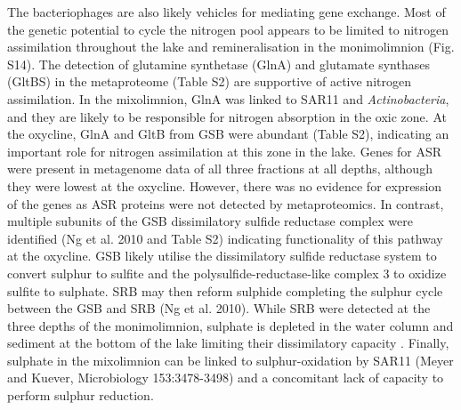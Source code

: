 The bacteriophages are also likely vehicles for mediating gene exchange.
Most of the genetic potential to cycle the nitrogen pool appears to be limited to nitrogen assimilation throughout the lake and remineralisation in the monimolimnion (Fig. S14). 
The detection of glutamine synthetase (GlnA) and glutamate synthases (GltBS) in the metaproteome (Table S2) are supportive of active nitrogen assimilation. 
In the mixolimnion, GlnA was linked to SAR11 and \emph{Actinobacteria}, and they are likely to be responsible for nitrogen absorption in the oxic zone. At the oxycline, GlnA and GltB from GSB were abundant (Table S2), indicating an important role for nitrogen assimilation at this zone in the lake.
Genes for \ac{ASR} were present in metagenome data of all three fractions at all depths, although they were lowest at the oxycline. 
However, there was no evidence for expression of the genes as ASR proteins were not detected by metaproteomics. In contrast, multiple subunits of the GSB dissimilatory sulfide reductase complex were identified (Ng et al. 2010 and Table S2) indicating functionality of this pathway at the oxycline. 
\ac{GSB} likely utilise the dissimilatory sulfide reductase system to convert sulphur to sulfite and the polysulfide-reductase-like complex 3 to oxidize sulfite to sulphate. 
SRB may then reform sulphide completing the sulphur cycle between the \ac{GSB} and \ac{SRB} (Ng et al. 2010). 
While \ac{SRB} were detected at the three depths of the monimolimnion, sulphate is depleted in the water column and sediment at the bottom of the lake limiting their dissimilatory capacity \cite{Rankin1999}. 
Finally, sulphate in the mixolimnion can be linked to sulphur-oxidation by SAR11 (Meyer and Kuever, Microbiology 153:3478-3498) and a concomitant lack of capacity to perform sulphur reduction. 


